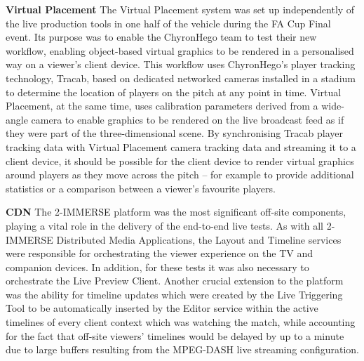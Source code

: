 \documentclass[sigchi-a, authorversion]{acmart}
\begin{document}
\textbf{Virtual Placement} The Virtual Placement system was set up independently
of the live production tools in one half of the vehicle during the FA Cup Final
event. Its purpose was to enable the ChyronHego team to test their new workflow,
enabling object-based virtual graphics to be rendered in a personalised way on
a viewer's client device. This workflow uses ChyronHego's player tracking
technology, Tracab, based on dedicated networked cameras installed in a stadium
to determine the location of players on the pitch at any point in time. Virtual
Placement, at the same time, uses calibration parameters derived from a wide-angle
camera to enable graphics to be rendered on the live broadcast feed as if they
were part of the three-dimensional scene. By synchronising Tracab player tracking
data with Virtual Placement camera tracking data and streaming it to a client
device, it should be possible for the client device to render virtual graphics
around players as they move across the pitch – for example to provide additional
statistics or a comparison between a viewer’s favourite players.

\textbf{CDN} The 2-IMMERSE platform \cite{kegel2017} was the most significant
off-site components, playing a vital role in the delivery of the end-to-end live
tests. As with all 2-IMMERSE Distributed Media Applications, the Layout and
Timeline services were responsible for orchestrating the viewer experience on
the TV and companion devices. In addition, for these tests it was also necessary
to orchestrate the Live Preview Client. Another crucial extension to the platform
was the ability for timeline updates which were created by the Live Triggering
Tool to be automatically inserted by the Editor service within the active
timelines of every client context which was watching the match, while accounting
for the fact that off-site viewers' timelines would be delayed by up to a minute
due to large buffers resulting from the MPEG-DASH live streaming configuration.

\end{document}
